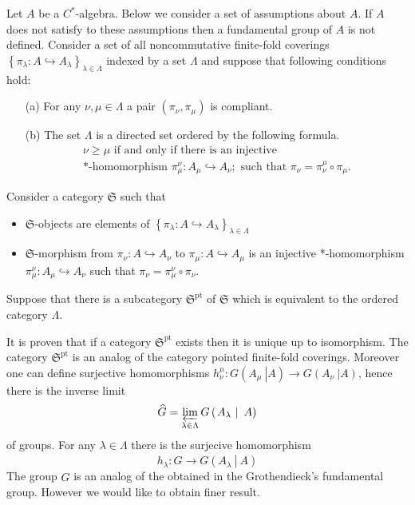 \documentclass{beamer}
\theoremstyle{plain}
\newcommand{\be}{\begin{equation}}
\newcommand{\ee}{\end{equation}}
\newcommand{\la}{\lambda}
\newcommand{\La}{\Lambda}
\newcommand{\hookto}{\hookrightarrow}        %
\begin{document}
\begin{frame}
Let $A$ be a $C^*$-algebra. Below we consider a set of assumptions about $A$. If $A$ does not satisfy to these assumptions then a fundamental group of $A$ is not defined. Consider a set of all noncommutative  finite-fold coverings $\left\{ \pi_{\la}:A \hookto A_{\la}\right\}_{\la \in \La}$ indexed by a set  $\La$ and suppose that  following conditions hold:
\begin{enumerate}
	\item[(a)] For any $\nu, \mu \in \La$ a pair $\left( \pi_\nu, \pi_\mu\right)$ is compliant.
	\item [(b)]
The set	$\La$ is a directed set ordered by the following formula.
	\be\label{fg_ord_eqn}
	\begin{split}
		\nu \ge \mu  \text{ if and only if there is an injective}\\ \text{*-homomorphism } \pi^\nu_\mu: A_\mu \hookto A_\nu; 
		\text{ such that } \pi_\nu = \pi^\mu_\nu \circ \pi_\mu.
	\end{split}
	\ee
\end{enumerate}
Consider a category $\mathfrak{S}$ such that
\begin{itemize}
	\item $\mathfrak{S}$-objects are elements of $\left\{ \pi_{\la}:A \hookto A_{\la}\right\}_{\la \in \La}$
	\item $\mathfrak{S}$-morphism from $ \pi_\nu: A \hookto A_{\nu}$ to $ \pi_\mu: A \hookto A_\mu$ is an injective *-homomorphism $\pi^\nu_\mu : A_\mu \hookto  A_\nu$ such that $\pi_\nu = \pi^{\nu}_\mu \circ \pi_\nu$. 
\end{itemize}
Suppose that there is a subcategory $\mathfrak{S}^{\text{pt}}$ of  $\mathfrak{S}$   which is equivalent to the ordered category $\La$. 
\end{frame}
\begin{frame}
	It is proven that if a category $\mathfrak{S}^{\text{pt}}$ exists then it is unique up to isomorphism. The category $\mathfrak{S}^{\text{pt}}$ is an analog of the category pointed finite-fold coverings. Moreover  one can define surjective homomorphisms  $h^\mu_\nu:  G\left(\left.A_\mu~\right|A \right) \to  G\left(\left.A_\nu~\right|A \right)$, hence there is the inverse limit 
	$$
	\widehat{G}=	\varprojlim_{\la \in \La} G\left(\left.A_\la~\right|~A\right)
	$$
	of groups. For any $\la \in \La$ there is the surjecive homomorphism 
	\be\label{h_la_eqn}
	h_\la:\widehat{G}\to G\left(\left.A_\la~\right|~A\right)
	\ee
	The group $\widehat{G}$ is an analog of the obtained in the Grothendieck's fundamental group. However we would like to obtain finer result.
\end{frame}
\end{document}
